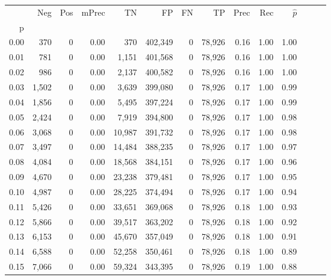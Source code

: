 \begin{tabular}{rrrrrrrrrrrrrr}
\toprule
{} &    Neg &    Pos & mPrec &       TN &       FP &      FN &      TP &  Prec &   Rec & $\hat{p}$ \\
p    &        &        &       &          &          &         &         &       &       &           \\
\midrule
0.00 &    370 &      0 &  0.00 &      370 &  402,349 &       0 &  78,926 &  0.16 &  1.00 &      1.00 \\
0.01 &    781 &      0 &  0.00 &    1,151 &  401,568 &       0 &  78,926 &  0.16 &  1.00 &      1.00 \\
0.02 &    986 &      0 &  0.00 &    2,137 &  400,582 &       0 &  78,926 &  0.16 &  1.00 &      1.00 \\
0.03 &  1,502 &      0 &  0.00 &    3,639 &  399,080 &       0 &  78,926 &  0.17 &  1.00 &      0.99 \\
0.04 &  1,856 &      0 &  0.00 &    5,495 &  397,224 &       0 &  78,926 &  0.17 &  1.00 &      0.99 \\
0.05 &  2,424 &      0 &  0.00 &    7,919 &  394,800 &       0 &  78,926 &  0.17 &  1.00 &      0.98 \\
0.06 &  3,068 &      0 &  0.00 &   10,987 &  391,732 &       0 &  78,926 &  0.17 &  1.00 &      0.98 \\
0.07 &  3,497 &      0 &  0.00 &   14,484 &  388,235 &       0 &  78,926 &  0.17 &  1.00 &      0.97 \\
0.08 &  4,084 &      0 &  0.00 &   18,568 &  384,151 &       0 &  78,926 &  0.17 &  1.00 &      0.96 \\
0.09 &  4,670 &      0 &  0.00 &   23,238 &  379,481 &       0 &  78,926 &  0.17 &  1.00 &      0.95 \\
0.10 &  4,987 &      0 &  0.00 &   28,225 &  374,494 &       0 &  78,926 &  0.17 &  1.00 &      0.94 \\
0.11 &  5,426 &      0 &  0.00 &   33,651 &  369,068 &       0 &  78,926 &  0.18 &  1.00 &      0.93 \\
0.12 &  5,866 &      0 &  0.00 &   39,517 &  363,202 &       0 &  78,926 &  0.18 &  1.00 &      0.92 \\
0.13 &  6,153 &      0 &  0.00 &   45,670 &  357,049 &       0 &  78,926 &  0.18 &  1.00 &      0.91 \\
0.14 &  6,588 &      0 &  0.00 &   52,258 &  350,461 &       0 &  78,926 &  0.18 &  1.00 &      0.89 \\
0.15 &  7,066 &      0 &  0.00 &   59,324 &  343,395 &       0 &  78,926 &  0.19 &  1.00 &      0.88 \\

\end{tabular}
